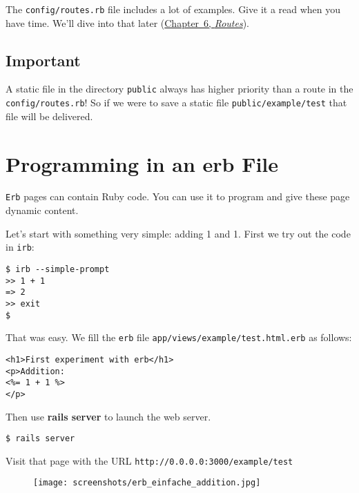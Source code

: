 \documentclass[a4paper]{book}
\begin{document}
The \texttt{config/routes.rb} file includes a lot of examples. Give it a read when you have time. We'll dive into that later (\hyperref[routes]{Chapter~6, \emph{Routes}}).

\subsection{Important}\label{important-4}

A static file in the directory \texttt{public} always has higher priority than a route in the \texttt{config/routes.rb}! So if we were to save a static file \texttt{public/example/test} that file will be delivered.

\section{Programming in an erb File}\label{programming-in-an-erb-file}

\texttt{Erb} pages can contain Ruby code. You can use it to program and give these page dynamic content.

Let's start with something very simple: adding 1 and 1. First we try out the code in \texttt{irb}:

\begin{shaded}\begin{verbatim}
$ irb --simple-prompt
>> 1 + 1
=> 2
>> exit
$
\end{verbatim}\end{shaded}

That was easy. We fill the \texttt{erb} file \texttt{app/views/example/test.html.erb} as follows:

\begin{shaded}\begin{verbatim}
<h1>First experiment with erb</h1>
<p>Addition:
<%= 1 + 1 %>
</p>
\end{verbatim}\end{shaded}

Then use \textbf{rails server} to launch the web server.

\begin{shaded}\begin{verbatim}
$ rails server
\end{verbatim}\end{shaded}

Visit that page with the URL \texttt{http://0.0.0.0:3000/example/test}

\begin{figure}[htbp]
\centering
\texttt{[image: screenshots/erb\_einfache\_addition.jpg]}
\end{figure}
\end{document}

